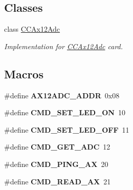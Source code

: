 \subsection*{Classes}
\begin{DoxyCompactItemize}
\item 
class \hyperlink{classCCAx12Adc}{C\+C\+Ax12\+Adc}
\begin{DoxyCompactList}\small\item\em Implementation for \hyperlink{classCCAx12Adc}{C\+C\+Ax12\+Adc} card. \end{DoxyCompactList}\end{DoxyCompactItemize}
\subsection*{Macros}
\begin{DoxyCompactItemize}
\item 
\mbox{\label{Driver-EV3_2CCAx12Adc_8hpp_a11c3429ef5816ff9292ff4891e1e9f0f}} 
\#define {\bfseries A\+X12\+A\+D\+C\+\_\+\+A\+D\+DR}~0x08
\item 
\mbox{\label{Driver-EV3_2CCAx12Adc_8hpp_a7e1515949622498f9414659f0c8f1f28}} 
\#define {\bfseries C\+M\+D\+\_\+\+S\+E\+T\+\_\+\+L\+E\+D\+\_\+\+ON}~10
\item 
\mbox{\label{Driver-EV3_2CCAx12Adc_8hpp_aec01094e11fafc299dd60d0a09944aa7}} 
\#define {\bfseries C\+M\+D\+\_\+\+S\+E\+T\+\_\+\+L\+E\+D\+\_\+\+O\+FF}~11
\item 
\mbox{\label{Driver-EV3_2CCAx12Adc_8hpp_ad8f637de49c5f4c0422b1c3d8c2449a6}} 
\#define {\bfseries C\+M\+D\+\_\+\+G\+E\+T\+\_\+\+A\+DC}~12
\item 
\mbox{\label{Driver-EV3_2CCAx12Adc_8hpp_a4e1dd6cd734aa509f3518fe45a266079}} 
\#define {\bfseries C\+M\+D\+\_\+\+P\+I\+N\+G\+\_\+\+AX}~20
\item 
\mbox{\label{Driver-EV3_2CCAx12Adc_8hpp_a1b73ec7cfd5c16a0341e5a4771fbc137}} 
\#define {\bfseries C\+M\+D\+\_\+\+R\+E\+A\+D\+\_\+\+AX}~21
\item 
\mbox{\label{Driver-EV3_2CCAx12Adc_8hpp_afd44c9c75f7aaf33735d052e708fc442}} 

\end{DoxyCompactItemize}
